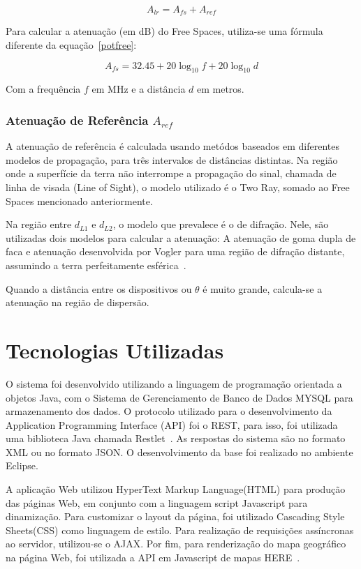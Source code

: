 \[
A_{lr} = A_{fs} + A_{ref}
\]

Para calcular a atenuação (em dB) do Free Spaces, utiliza-se uma fórmula diferente da equação~\ref{potfree}:

\[
A_{fs} = 32.45 + 20 \log_{10}f + 20 \log_{10}d 
\]

Com a frequência $f$ em MHz e a distância $d$ em metros.

\subsubsection{Atenuação de Referência $A_{ref}$}

A atenuação de referência é calculada usando metódos baseados em diferentes modelos de propagação, para três intervalos de distâncias distintas. Na região onde a superfície da terra não interrompe a propagação do sinal, chamada de linha de visada (Line of Sight), o modelo utilizado é o Two Ray, somado ao Free Spaces mencionado anteriormente.

Na região entre $d_{L1}$ e $d_{L2}$, o modelo que prevalece é o de difração\cite{rufford}. Nele, são utilizadas dois modelos para calcular a atenuação: A atenuação de goma dupla de faca e atenuação desenvolvida por Vogler para uma região de difração distante, assumindo a terra perfeitamente esférica~\cite{vogler}.

Quando a distância entre os dispositivos ou $\theta$ é muito grande, calcula-se a atenuação na região de dispersão.

\section{Tecnologias Utilizadas}

O sistema foi desenvolvido utilizando a linguagem de programação orientada a objetos Java, com o Sistema de Gerenciamento de Banco de Dados MYSQL
para armazenamento dos dados. O protocolo utilizado para o desenvolvimento da  Application Programming Interface (API)
foi o REST, para isso, foi utilizada uma biblioteca Java chamada Restlet~\cite{restlet}. As respostas do sistema são no formato XML ou no formato JSON. O desenvolvimento da base foi realizado no ambiente Eclipse.

A aplicação Web utilizou  HyperText Markup Language(HTML)
para produção das páginas Web, em conjunto com a linguagem script Javascript para dinamização. Para customizar o layout da página, foi utilizado Cascading Style Sheets(CSS)
como linguagem de estilo. Para realização de requisições assíncronas ao servidor, utilizou-se o AJAX. Por fim, para renderização do mapa geográfico na página Web, foi utilizada a API em Javascript de mapas HERE~\cite{heremaps}. 

